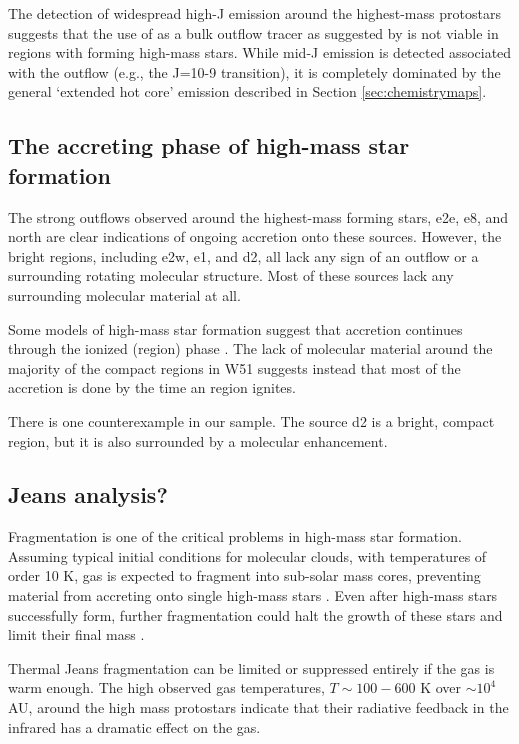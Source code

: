\documentclass{aa}
\begin{document}
The detection of widespread high-J \methanol emission around the highest-mass
protostars suggests that the use of \methanol as a bulk outflow tracer as
suggested by \citet{Kristensen2015a} is not viable in regions with forming
high-mass stars.  While mid-J \methanol emission is detected associated with
the outflow (e.g., the J=10-9 transition), it is completely dominated by the
general `extended hot core' emission described in Section
\ref{sec:chemistrymaps}.


\subsection{The accreting phase of high-mass star formation}
The strong outflows observed around the highest-mass forming stars, e2e, e8,
and north are clear indications of ongoing accretion onto these sources.
However, the bright \hii regions, including e2w, e1, and d2, all lack any sign
of an outflow or a surrounding rotating molecular structure.  Most of these
sources lack any surrounding molecular material at all.

Some models of high-mass star formation suggest that accretion continues
through the ionized (\hii region) phase \citep{Keto2007a}.  The lack of
molecular material around the majority of the compact \hii regions in W51
suggests instead that most of the accretion is done by the time an \hii region
ignites.

There is one counterexample in our sample.  The source d2 is a bright, compact
\hii region, but it is also surrounded by a molecular enhancement.

\subsection{Jeans analysis?}
Fragmentation is one of the critical problems in high-mass star formation.
Assuming typical initial conditions for molecular clouds, with temperatures of
order 10 K, gas is expected to fragment into sub-solar mass cores, preventing
material from accreting onto single high-mass stars \citep{Krumholz2015a}.
Even after high-mass stars successfully form, further fragmentation could
halt the growth of these stars and limit their final mass \citep{Peters2010a}.

Thermal Jeans fragmentation can be limited or suppressed entirely if the gas is
warm enough.  The high observed gas temperatures, $T\sim100-600$ K over
$\sim10^4$ AU, around the high mass protostars indicate that their radiative
feedback in the infrared has a dramatic effect on the gas.  
\end{document}
